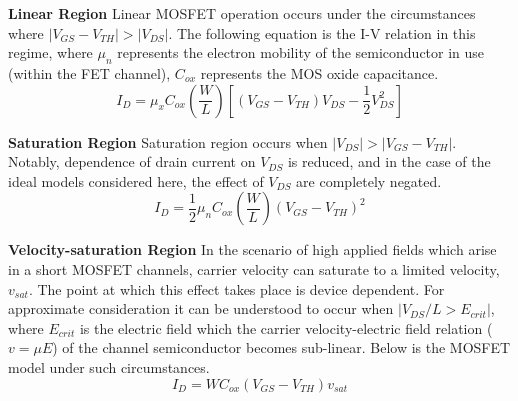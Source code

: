 
	\textbf{Linear Region}
	Linear MOSFET operation occurs under the circumstances where  $|V_{GS}-V_{TH}| > |V_{DS}|$. The following equation is the I-V relation in this regime, where $\mu_n$ represents the electron mobility of the semiconductor in use (within the FET channel), $C_{ox}$ represents the MOS oxide capacitance. 
	\begin{equation}
		I_D = \mu_x C_{ox} \left(\frac{W}{L}\right)\left[(V_{GS}-V_{TH})V_{DS}-\frac{1}{2}V_{DS}^2\right]
	\end{equation}

	\textbf{Saturation Region}
	Saturation region occurs when $|V_{DS}| > |V_{GS}-V_{TH}|$. Notably, dependence of drain current on $V_{DS}$ is reduced, and in the case of the ideal models considered here, the effect of $V_{DS}$ are completely negated.
	\begin{equation}
		I_D = \frac{1}{2}\mu_n C_{ox} \left(\frac{W}{L}\right)(V_{GS}-V_{TH})^2
	\end{equation}


	\textbf{Velocity-saturation Region}
	In the scenario of high applied fields which arise in a short MOSFET channels, carrier velocity can saturate to a limited velocity, $v_{sat}$. The point at which this effect takes place is device dependent. For approximate consideration it can be understood to occur when $|V_{DS}/L > E_{crit}|$, where $E_{crit}$ is the electric field which the carrier velocity-electric field relation ($v = \mu E$) of the channel semiconductor becomes sub-linear. Below is the MOSFET model under such circumstances.
	\begin{equation}
		I_D = WC_{ox}(V_{GS}-V_{TH})v_{sat}
	\end{equation}

